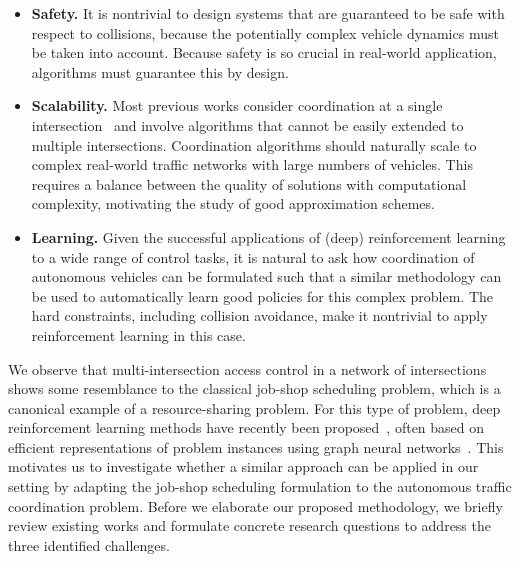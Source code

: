\documentclass{article}
\theoremstyle{definition}
\theoremstyle{plain}
\begin{document}
\begin{itemize}

  \item \textbf{Safety.} It is nontrivial to design systems that are guaranteed
        to be safe with respect to collisions, because the potentially complex
        vehicle dynamics must be taken into account. Because safety is so
        crucial in real-world application, algorithms must guarantee this by
        design.

  \item \textbf{Scalability.} Most previous works consider coordination at a single
        intersection~\cite{khayatianSurveyIntersectionManagement2020} and involve algorithms that cannot be easily extended
        to multiple intersections. Coordination algorithms should naturally
        scale to complex real-world traffic networks with large numbers of
        vehicles. This requires a balance between the quality of solutions with
        computational complexity, motivating the study of good approximation
        schemes.

  \item \textbf{Learning.} Given the successful applications of (deep) reinforcement learning
        to a wide range of control tasks, it is natural to ask how
        coordination of autonomous vehicles can be formulated such that a
        similar methodology can be used to automatically learn good policies for
        this complex problem.
        The hard constraints, including collision avoidance, make it nontrivial to
        apply reinforcement learning in this case.
\end{itemize}

We observe that multi-intersection access control in a network of intersections
shows some resemblance to the classical job-shop scheduling problem, which is a
canonical example of a resource-sharing problem. For this type of problem, deep
reinforcement learning methods have recently been proposed~\cite{zhangLearningDispatchJob2020,zhangDeepReinforcementLearning2024}, often based on
efficient representations of problem instances using graph neural
networks~\cite{smitGraphNeuralNetworks2024}. This motivates us to investigate
whether a similar approach can be applied in our setting by adapting the
job-shop scheduling formulation to the autonomous traffic coordination problem.
Before we elaborate our proposed methodology, we briefly review existing works
and formulate concrete research questions to address the three identified
challenges.
\end{document}
